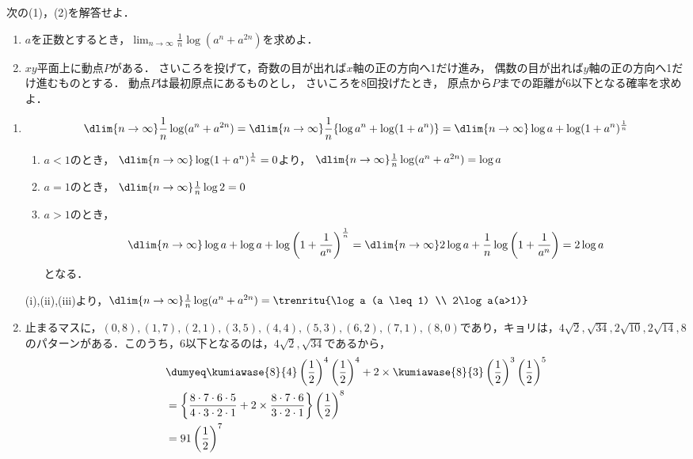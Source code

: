 \begin{problem}
  次の(1)，(2)を解答せよ．
\begin{enumerate}
\item $a$を正数とするとき，$\displaystyle\lim_{n\to\infty}\frac{1}{n}\log(a^n+a^{2n})$を求めよ．
\item $xy$平面上に動点$P$がある．
さいころを投げて，奇数の目が出れば$x$軸の正の方向へ1だけ進み，
偶数の目が出れば$y$軸の正の方向へ1だけ進むものとする．
動点$P$は最初原点にあるものとし，
さいころを8回投げたとき，
原点から$P$までの距離が6以下となる確率を求めよ．
\end{enumerate}
\end{problem}

\begin{enumerate}
  \item \[\dlim{n\to\infty} \frac{1}{n}\log(a^n+a^{2n})
    = \dlim{n\to\infty} \frac{1}{n}\{\log a^n + \log (1+a^n)\}
    = \dlim{n\to\infty} \log a + \log (1+a^n)^{\frac{1}{n}}
  \]
  \begin{enumerate}
    \item $a<1$のとき，
      $\dlim{n\to\infty} \log (1+a^n)^{\frac{1}{n}} = 0$より，
      $\dlim{n\to\infty} \frac{1}{n} \log (a^n + a^{2n}) = \log a$

    \item $a=1$のとき，
      $\dlim{n\to\infty} \frac{1}{n}\log 2 = 0$

    \item $a>1$のとき，
    \[
      \dlim{n\to\infty} \log a + \log a + \log \left( 1+\frac{1}{a^n} \right)^{\frac{1}{n}}
      = \dlim{n\to\infty}2\log a + \frac{1}{n}\log \left(1+\frac{1}{a^n} \right)
      = 2\log a
    \]
    となる．
  \end{enumerate}
  (i),(ii),(iii)より，$\dlim{n\to\infty} \frac{1}{n}\log(a^n+a^{2n}) = \trenritu{\log a (a \leq 1) \\ 2\log a(a>1)}$


  \item 止まるマスに，$(0,8),(1,7),(2,1),(3,5),(4,4),(5,3),(6,2),(7,1),(8,0)$であり，キョリは，$4\sqrt2, \sqrt{34},2\sqrt{10},2\sqrt{14},8$のパターンがある．このうち，6以下となるのは，$4\sqrt2,\sqrt{34}$であるから，
  \begin{align*}
    &\dumyeq \kumiawase{8}{4}\left( \frac12 \right)^4\left( \frac12 \right)^4+2\times \kumiawase{8}{3} \left( \frac12 \right)^3 \left( \frac12 \right)^5 \\
    &= \left\{ \frac{8\cdot 7\cdot 6\cdot 5}{4\cdot 3\cdot 2\cdot 1} + 2\times \frac{8\cdot 7\cdot 6}{3\cdot 2\cdot 1} \right\}\left( \frac12 \right)^8 \\
    &= 91 \left( \frac{1}{2} \right)^7
  \end{align*}
\end{enumerate}
